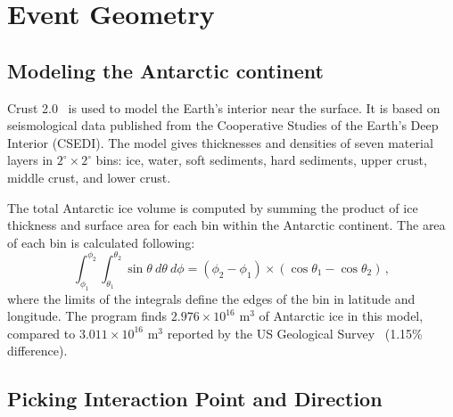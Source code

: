 \section{Event Geometry}
\label{sec:eventGeometry}

\subsection{Modeling the Antarctic continent}
Crust 2.0~\cite{crust2} is used to model the Earth's interior near the 
surface.  It is based on seismological data published from the Cooperative Studies of the Earth's Deep Interior (CSEDI).
The model gives thicknesses and densities of seven material
layers in $2^{\circ} \times 2^{\circ}$ bins:  ice, water, soft sediments, hard sediments, upper crust,
middle crust, and lower crust.  

The total Antarctic ice volume is computed by summing the product of ice
thickness and surface area for each bin within the Antarctic continent.
The area of each bin is calculated following:
\begin{equation}
\int_{\phi_1}^{\phi_2}\int_{\theta_1}^{\theta_2}\sin{\theta}~d\theta~d\phi=\left(\phi_2-\phi_1\right)\times\left(\cos{\theta_1}-\cos{\theta_2}\right) \, ,
\end{equation}
\noindent where the limits of the integrals define the edges of the bin in
latitude and longitude.
The \icemc program finds $2.976 \times 10^{16}$ m$^3$ of Antarctic ice in this model, compared to $3.011 \times 10^{16}$ m$^3$ reported by the US Geological Survey~\cite{usgs} (1.15\% difference).


\subsection{Picking Interaction Point and Direction}
\label{sec:pickneutrino}

